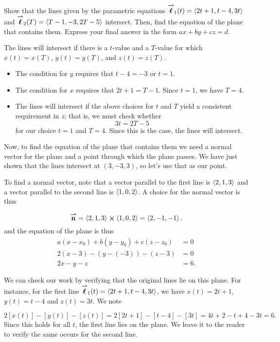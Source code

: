 \documentclass[noauthor]{ximera}
\begin{document}
\begin{problem}
Show that the lines given by the parametric equations ${\overset{\boldsymbol{\rightharpoonup}}{\mathbf{\boldsymbol{\ell}}}}_1(t)=\left\langle 2t+1,t-4,3t\right\rangle$ and ${\overset{\boldsymbol{\rightharpoonup}}{\mathbf{\boldsymbol{\ell}}}}_2(T)=\left\langle T-1,-3,2T-5\right\rangle$ intersect.
Then, find the equation of the plane that contains them.  Express your final answer in the form $ax+by+cz=d$.

\begin{freeResponse}
The lines will intersect if there is a $t$-value and a $T$-value for which $x(t)=x(T)$, $y(t)=y(T)$, and $z(t)=z(T)$.  

\begin{itemize}
\item The condition for $y$ requires that $t-4=-3$ or $t=1$.  
\item The condition for $x$ requires that $2t+1=T-1$.  Since $t=1$, we have $T=4$.
\item The lines will intersect if the above choices for $t$ and $T$ yield a consistent requirement in $z$; that is, we must check whether
\[
3t=2T-5
\]
for our choice $t=1$ and $T=4$. Since this is the case, the lines will intersect.
\end{itemize}

Now, to find the equation of the plane that contains them we need a normal vector for the plane and a point through which the plane passes.  We have just shown that the lines intersect at $(3,-3,3)$, so let's use that as our point.

To find a normal vector, note that a vector parallel to the first line is $\left\langle 2,1,3\right\rangle$ and a vector parallel to the second line is $\left\langle 1,0,2\right\rangle$.  A choice for the normal vector is thus 

\[
{\overset{\boldsymbol{\rightharpoonup}}{\mathbf{n}}} = \left\langle 2,1,3\right\rangle \boldsymbol\times \left\langle 1,0,2\right\rangle = \left\langle 2,-1,-1\right\rangle.
\]
and the equation of the plane is thus
\begin{align*}
a(x-x_0)+b(y-y_0)+c(z-z_0) &= 0 \\
2(x-3)-(y-(-3))-(z-3) &= 0 \\
2x-y-z &= 6.
\end{align*}

\begin{remark}
We can check our work by verifying that the original lines lie on this plane.  For instance, for the first line ${\overset{\boldsymbol{\rightharpoonup}}{\mathbf{\boldsymbol{\ell}}}}_1(t)=\left\langle 2t+1,t-4,3t\right\rangle$, we have $x(t) = 2t+1$, $y(t) =t-4$ and $z(t) =3t$.  We note

\[
2[x(t)]-[y(t)]-[z(t)] = 2[2t+1]-[t-4]-[3t] = 4t+2-t+4-3t = 6.
\]
Since this holds for all $t$, the first line lies on the plane.  We leave it to the reader to verify the same occurs for the second line.
\end{remark}

\end{freeResponse}
\end{problem}
\end{document}
